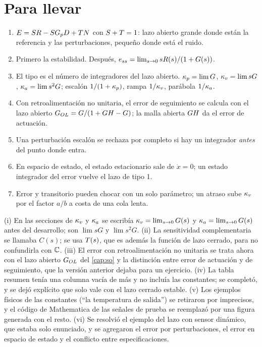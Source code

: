 \section{Para llevar}
\label{sec:er-cierre}

\begin{parallevar}
\begin{enumerate}
  \item $E=S R-SG_p D+T N$ con $S+T=1$: lazo abierto grande donde están la referencia y las perturbaciones, pequeño donde está el ruido.
  \item Primero la estabilidad. Después, $e_{ss}=\lim_{s\to0}sR(s)/(1+G(s))$.
  \item El tipo es el número de integradores del lazo abierto. $\kappa_p=\lim G$, $\kappa_v=\lim sG$, $\kappa_a=\lim s^2G$; escalón $1/(1+\kappa_p)$, rampa $1/\kappa_v$, parábola $1/\kappa_a$.
  \item Con retroalimentación no unitaria, el error de seguimiento se calcula con el lazo abierto $G_{OL}=G/(1+GH-G)$; la malla abierta $GH$ da el error de actuación.
  \item Una perturbación escalón se rechaza por completo si hay un integrador \emph{antes} del punto donde entra.
  \item En espacio de estado, el estado estacionario sale de $\dot x=0$; un estado integrador del error vuelve el lazo de tipo 1.
  \item Error y transitorio pueden chocar con un solo parámetro; un atraso sube $\kappa_v$ por el factor $a/b$ a costa de una cola lenta.
\end{enumerate}
\end{parallevar}

\begin{profundiza}
(i) En las secciones de $\kappa_v$ y $\kappa_a$ se escribía $\kappa_v=\lim_{s\to0}G(s)$ y $\kappa_a=\lim_{s\to0}G(s)$ antes del desarrollo; son $\lim sG$ y $\lim s^2G$. (ii) La sensitividad complementaria se llamaba $C(s)$; se usa $T(s)$, que es además la función de lazo cerrado, para no confundirla con $\mathbb{C}$. (iii) El error con retroalimentación no unitaria se trata ahora con el lazo abierto $G_{OL}$ del \cref{cap:so} y la distinción entre error de actuación y de seguimiento, que la versión anterior dejaba para un ejercicio. (iv) La tabla resumen tenía una columna vacía de más y no incluía las constantes; se completó, y se dejó explícito que solo vale con el lazo cerrado estable. (v) Los ejemplos físicos de las constantes (``la temperatura de salida'') se retiraron por imprecisos, y el código de Mathematica de las señales de prueba se reemplazó por una figura generada con el resto. (vi) Se resolvió el ejemplo del lazo con sensor dinámico, que estaba solo enunciado, y se agregaron el error por perturbaciones, el error en espacio de estado y el conflicto entre especificaciones.
\end{profundiza}

